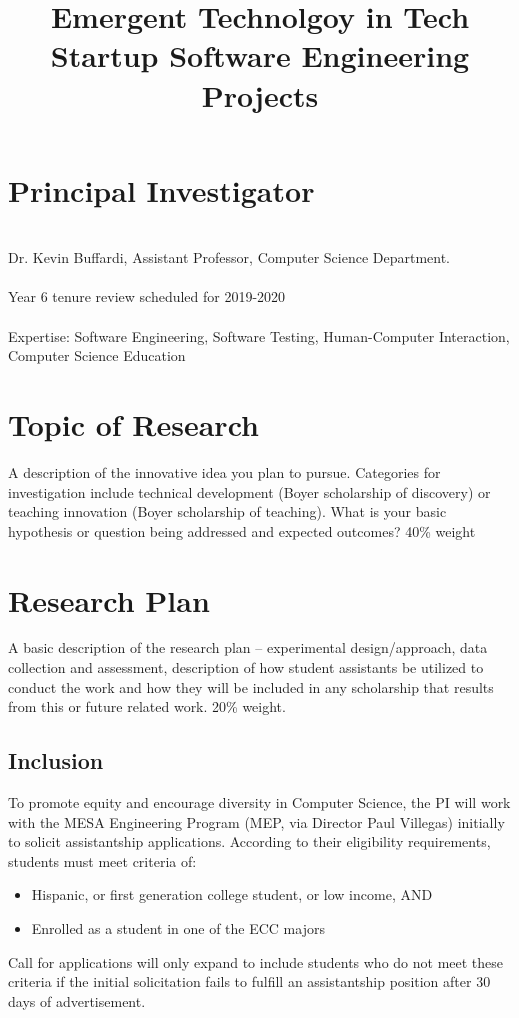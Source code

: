\documentclass[letterpaper]{article}
\title{Emergent Technolgoy in Tech Startup Software Engineering Projects}
\author{}
\date{}
\begin{document}
\maketitle
\section{Principal Investigator}
\\
Dr. Kevin Buffardi, Assistant Professor, Computer Science Department.\\
\\
Year 6 tenure review scheduled for 2019-2020 \\
\\
Expertise: Software Engineering, Software Testing, Human-Computer Interaction, Computer Science Education

\section{Topic of Research}
A description of the innovative idea you plan to pursue. Categories for
investigation include technical development (Boyer scholarship of discovery) or teaching innovation (Boyer scholarship of teaching). What is your basic hypothesis or question being addressed and expected outcomes? 40\% weight

\section{Research Plan}
A basic description of the research plan – experimental design/approach, data
collection and assessment, description of how student assistants be utilized to conduct the work and how they will be included in any scholarship that results from this or future related work. 20\% weight.

\subsection{Inclusion}
To promote equity and encourage diversity in Computer Science, the PI will work with the MESA Engineering Program (MEP, via Director Paul Villegas) initially to solicit assistantship applications. According to their eligibility requirements, students must meet criteria of:
\begin{itemize}
  \item Hispanic, or first generation college student, or low income, AND
  \item Enrolled as a student in one of the ECC majors
\end{itemize}
Call for applications will only expand to include students who do not meet these criteria if the initial solicitation fails to fulfill an assistantship position after 30 days of advertisement.
\end{document}
